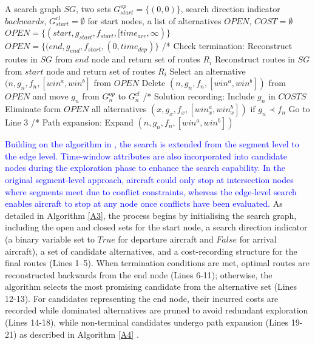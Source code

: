 \documentclass{article}
\newcommand*{\blue}{\textcolor{blue}}
\begin{document}
\begin{algorithm}
	\caption{AMOA*}\label{A3}
	 A search graph $SG$, two sets $G_{start}^{op}=\{(0,0)\}$, search direction indicator $backwards$, $G_{start}^{cl}={\emptyset}$ for start nodes, a list of alternatives $OPEN$, $COST={\emptyset}$ \;
            {
            $OPEN=\{(start, g_{start}, f_{start}, [time_{arr}, \infty)\}$ \;
            }
        \Else
            {
            $OPEN=\{(end, g_{end}, f_{start}, (0, time_{dep})\}$ \;
            }
        /* Check termination: \;
        {
            {
            Reconstruct routes in $SG$ from $end$ node and return set of routes $R_i$ \;
            }
            \Else
            {
            Reconstruct routes in $SG$ from $start$ node and return set of routes $R_i$ \;
            }
        }
        Select an alternative $(n,g_n,f_n,[win^a,win^b]$ from $OPEN$ \;
        Delete $(n,g_n,f_n,[win^a,win^b])$ from $OPEN$ and move $g_n$ from $G_{n}^{op}$ to $G_{n}^{cl}$ \;
        {
        /* Solution recording: \;
        Include $g_n$ in $COSTS$ \;
        Eliminate form $OPEN$ all alternatives $(x,g_x,f_x,[win_x^a,win_x^b])$ if $g_n \prec f_n$ \;
        Go to Line 3 \;
        }
        \Else 
        {
        /* Path expansion: \;
        Expand $(n,g_n,f_n,[win^a,win^b])$ \;
        }
\end{algorithm}

\blue{Building on the algorithm in \cite{weiszer2020fuel}, the search is extended from the segment level to the edge level. Time-window attributes are also incorporated into candidate nodes during the exploration phase to enhance the search capability. In the original segment-level approach, aircraft could only stop at intersection nodes where segments meet due to conflict constraints, whereas the edge-level search enables aircraft to stop at any node once conflicts have been evaluated.} As detailed in Algorithm \ref{A3}, the process begins by initialising the search graph, including the open and closed sets for the start node, a search direction indicator (a binary variable set to $True$ for departure aircraft and $False$ for arrival aircraft), a set of candidate alternatives, and a cost-recording structure for the final routes (Lines 1–5). When termination conditions are met, optimal routes are reconstructed backwards from the end node (Lines 6-11); otherwise, the algorithm selects the most promising candidate from the alternative set (Lines 12-13). For candidates representing the end node, their incurred costs are recorded while dominated alternatives are pruned to avoid redundant exploration (Lines 14-18), while non-terminal candidates undergo path expansion (Lines 19-21) as described in Algorithm \ref{A4} \cite{weiszer2020multi}.    
\end{document}
